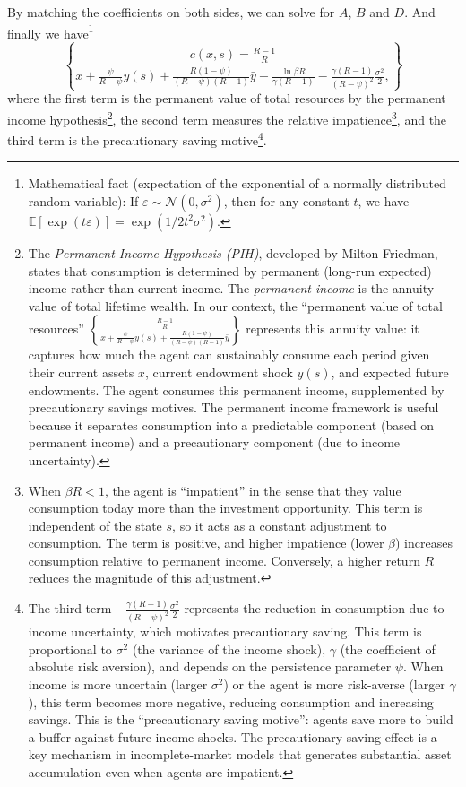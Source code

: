 By matching the coefficients on both sides, we can solve for $A$, $B$ and $D$. And finally we have\footnote{
    Mathematical fact (expectation of the exponential of a normally distributed random variable): If $\varepsilon \sim \mathcal{N}(0, \sigma^2)$, then for any constant $t$, we have $\mathbb{E}[\exp(t\varepsilon)] = \exp(1/2t^2\sigma^2)$.
}
\[
c(x,s) = \frac{R-1}{R}\brace{x+\frac{\psi}{R-\psi}y(s)+\frac{R(1-\psi)}{(R-\psi)(R-1)}\bar y}-\frac{\ln \beta R}{\gamma (R-1)}-\frac{\gamma (R-1)}{(R-\psi)^2}\frac{\sigma^2}{2},
\]
where the first term is the permanent value of total resources by the permanent income hypothesis\footnote{
    The \textit{Permanent Income Hypothesis (PIH)}, developed by Milton Friedman, states that consumption is determined by permanent (long-run expected) income rather than current income. The \textit{permanent income} is the annuity value of total lifetime wealth. In our context, the ``permanent value of total resources'' $\frac{R-1}{R}\brace{x+\frac{\psi}{R-\psi}y(s)+\frac{R(1-\psi)}{(R-\psi)(R-1)}\bar y}$ represents this annuity value: it captures how much the agent can sustainably consume each period given their current assets $x$, current endowment shock $y(s)$, and expected future endowments. The agent consumes this permanent income, supplemented by precautionary savings motives. The permanent income framework is useful because it separates consumption into a predictable component (based on permanent income) and a precautionary component (due to income uncertainty).
}, the second term measures the relative impatience\footnote{
    When $\beta R < 1$, the agent is ``impatient'' in the sense that they value consumption today more than the investment opportunity. This term is independent of the state $s$, so it acts as a constant adjustment to consumption. The term is positive, and higher impatience (lower $\beta$) increases consumption relative to permanent income. Conversely, a higher return $R$ reduces the magnitude of this adjustment.
}, and the third term is the precautionary saving motive\footnote{
    The third term $-\frac{\gamma (R-1)}{(R-\psi)^2}\frac{\sigma^2}{2}$ represents the reduction in consumption due to income uncertainty, which motivates precautionary saving. This term is proportional to $\sigma^2$ (the variance of the income shock), $\gamma$ (the coefficient of absolute risk aversion), and depends on the persistence parameter $\psi$. When income is more uncertain (larger $\sigma^2$) or the agent is more risk-averse (larger $\gamma$), this term becomes more negative, reducing consumption and increasing savings. This is the ``precautionary saving motive'': agents save more to build a buffer against future income shocks. The precautionary saving effect is a key mechanism in incomplete-market models that generates substantial asset accumulation even when agents are impatient.
}.

